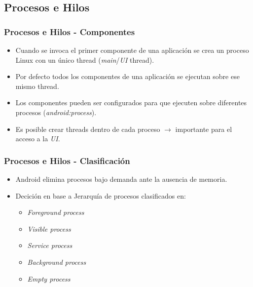 \subsection{Procesos e Hilos}
\begin{frame}
  \frametitle{Procesos e Hilos - Componentes}
  \begin{itemize}
    \item Cuando se invoca el primer componente de una aplicación se crea un proceso Linux con un único thread (\textit{main}/\textit{UI} thread).
    
    \item Por defecto todos los componentes de una aplicación se ejecutan sobre ese mismo thread.
    
    \item Los componentes pueden ser configurados para que ejecuten sobre diferentes procesos (\textit{android:process}).
    
    \item Es posible crear threads dentro de cada proceso $\rightarrow$ importante para el acceso a la \textit{UI}.
  \end{itemize}
\end{frame}

\begin{frame}
  \frametitle{Procesos e Hilos - Clasificación}
  \begin{itemize}
    \item Android elimina procesos bajo demanda ante la ausencia de memoria.
    
    \item Decición en base a Jerarquía de procesos clasificados en:
    \begin{itemize}
     \item \textit{Foreground process}
     \item \textit{Visible process}
     \item \textit{Service process}
     \item \textit{Background process}
     \item \textit{Empty process}
    \end{itemize}       
  \end{itemize}
\end{frame}

